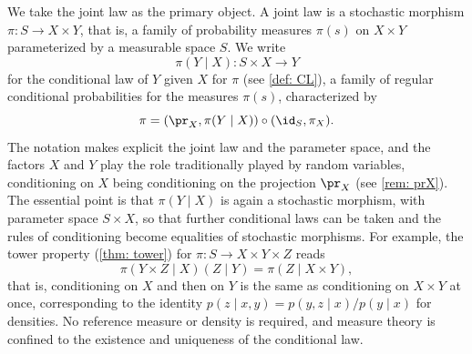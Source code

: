 \documentclass[12pt,reqno]{amsart}%
\theoremstyle{plain}
\theoremstyle{definition}
\begin{document}
We take the joint law as the primary object.
A joint law is a stochastic morphism $\pi\colon S\rightarrow X\times Y$,
that is, a family of probability measures $\pi(s)$ on $X\times Y$ parameterized by a measurable space $S$.
We write
\[
	\pi(Y\mid X)\colon S\times X\rightarrow Y
\]
for the conditional law of $Y$ given $X$ for $\pi$ (see \cref{def: CL}), a family of regular conditional probabilities
for the measures $\pi(s)$, characterized by
\[
	\pi=(\pr_X,\pi(Y\mid X))\circ(\id_S,\pi_X).
\]
The notation makes explicit the joint law and the parameter space,
and the factors $X$ and $Y$ play the role traditionally played by random variables,
conditioning on $X$ being conditioning on the projection $\pr_X$ (see \cref{rem: prX}).
The essential point is that $\pi(Y\mid X)$ is again a stochastic morphism, with parameter space $S\times X$,
so that further conditional laws can be taken and the rules of conditioning become equalities of stochastic morphisms.
For example, the tower property (\cref{thm: tower}) for $\pi\colon S\rightarrow X\times Y\times Z$ reads
\[
	\pi(Y\times Z\mid X)(Z\mid Y)=\pi(Z\mid X\times Y),
\]
that is, conditioning on $X$ and then on $Y$ is the same as conditioning on $X\times Y$ at once,
corresponding to the identity $p(z\mid x,y)=p(y,z\mid x)/p(y\mid x)$ for densities.
No reference measure or density is required, and measure theory is confined to the existence and uniqueness
of the conditional law.%
\end{document}
